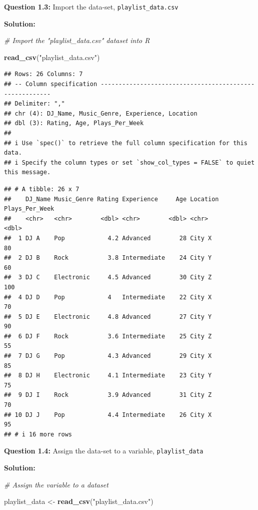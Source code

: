\documentclass[
]{article}
\newenvironment{Shaded}{\begin{snugshade}}{\end{snugshade}}
\newcommand{\CommentTok}[1]{\textcolor[rgb]{0.56,0.35,0.01}{\textit{#1}}}
\newcommand{\FunctionTok}[1]{\textcolor[rgb]{0.13,0.29,0.53}{\textbf{#1}}}
\newcommand{\NormalTok}[1]{#1}
\newcommand{\OtherTok}[1]{\textcolor[rgb]{0.56,0.35,0.01}{#1}}
\newcommand{\StringTok}[1]{\textcolor[rgb]{0.31,0.60,0.02}{#1}}
\begin{document}
\textbf{Question 1.3:} Import the data-set, \texttt{playlist\_data.csv}

\textbf{Solution:}

\begin{Shaded}
\begin{Highlighting}[]
\CommentTok{\# Import the "playlist\_data.csv" dataset into R }

\FunctionTok{read\_csv}\NormalTok{(}\StringTok{"playlist\_data.csv"}\NormalTok{) }
\end{Highlighting}
\end{Shaded}

\begin{verbatim}
## Rows: 26 Columns: 7
## -- Column specification --------------------------------------------------------
## Delimiter: ","
## chr (4): DJ_Name, Music_Genre, Experience, Location
## dbl (3): Rating, Age, Plays_Per_Week
## 
## i Use `spec()` to retrieve the full column specification for this data.
## i Specify the column types or set `show_col_types = FALSE` to quiet this message.
\end{verbatim}

\begin{verbatim}
## # A tibble: 26 x 7
##    DJ_Name Music_Genre Rating Experience     Age Location Plays_Per_Week
##    <chr>   <chr>        <dbl> <chr>        <dbl> <chr>             <dbl>
##  1 DJ A    Pop            4.2 Advanced        28 City X               80
##  2 DJ B    Rock           3.8 Intermediate    24 City Y               60
##  3 DJ C    Electronic     4.5 Advanced        30 City Z              100
##  4 DJ D    Pop            4   Intermediate    22 City X               70
##  5 DJ E    Electronic     4.8 Advanced        27 City Y               90
##  6 DJ F    Rock           3.6 Intermediate    25 City Z               55
##  7 DJ G    Pop            4.3 Advanced        29 City X               85
##  8 DJ H    Electronic     4.1 Intermediate    23 City Y               75
##  9 DJ I    Rock           3.9 Advanced        31 City Z               70
## 10 DJ J    Pop            4.4 Intermediate    26 City X               95
## # i 16 more rows
\end{verbatim}

\textbf{Question 1.4:} Assign the data-set to a variable,
\texttt{playlist\_data}

\textbf{Solution:}

\begin{Shaded}
\begin{Highlighting}[]
\CommentTok{\# Assign the variable to a dataset }

\NormalTok{playlist\_data }\OtherTok{\textless{}{-}} \FunctionTok{read\_csv}\NormalTok{(}\StringTok{"playlist\_data.csv"}\NormalTok{) }
\end{Highlighting}
\end{Shaded}
\end{document}

